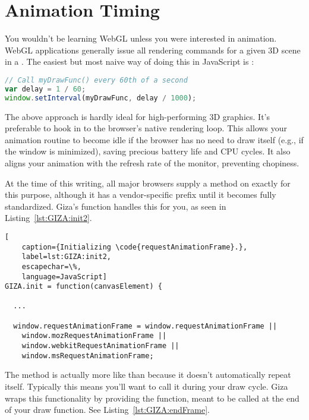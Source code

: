 \section{Animation Timing}

You wouldn't be learning WebGL unless you were interested in animation.  WebGL applications generally issue all rendering commands for a given 3D scene in a .  The easiest but most naive way of doing this in JavaScript is :

\begin{lstlisting}[language=JavaScript]
// Call myDrawFunc() every 60th of a second
var delay = 1 / 60;
window.setInterval(myDrawFunc, delay / 1000);
\end{lstlisting}

The above approach is hardly ideal for high-performing 3D graphics.  It's preferable to hook in to the browser's native rendering loop.  This allows your animation routine to become idle if the browser has no need to draw itself (e.g., if the window is minimized), saving precious battery life and CPU cycles.  It also aligns your animation with the refresh rate of the monitor, preventing chopiness.

At the time of this writing, all major browsers supply a method on  exactly for this purpose, although it has a vendor-specific prefix until it becomes fully standardized.  Giza's  function handles this for you, as seen in Listing~\ref{lst:GIZA:init2}.

\begin{lstlisting}[
    caption={Initializing \code{requestAnimationFrame}.},
    label=lst:GIZA:init2,
    escapechar=\%,
    language=JavaScript]
GIZA.init = function(canvasElement) {

  ...

  window.requestAnimationFrame = window.requestAnimationFrame ||
    window.mozRequestAnimationFrame ||
    window.webkitRequestAnimationFrame ||
    window.msRequestAnimationFrame;
\end{lstlisting} 

The  method is actually more like  than  because it doesn't automatically repeat itself.  Typically this means you'll want to call it during your draw cycle.  Giza wraps this functionality by providing the  function, meant to be called at the end of your draw function. See Listing~\ref{lst:GIZA:endFrame}.

